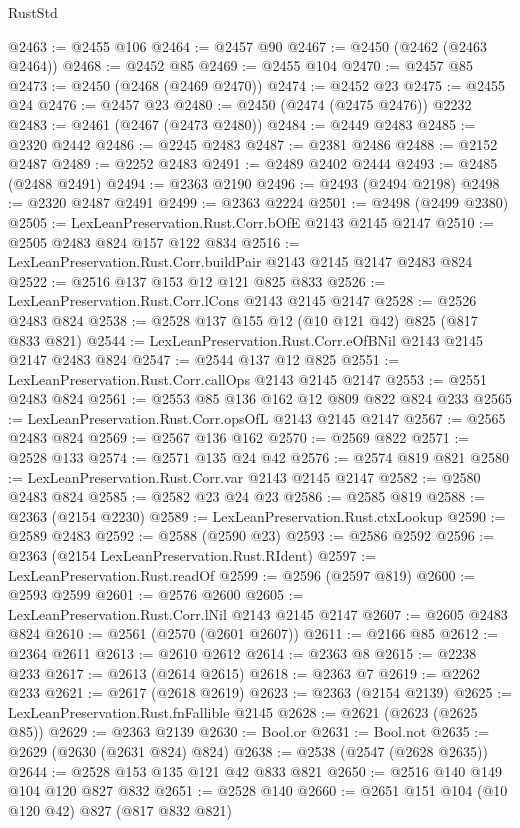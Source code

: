 \begin{lexlean}{RustStd}
\begin{coremodule}
@2463 := @2455 @106
@2464 := @2457 @90
@2467 := @2450 (@2462 (@2463 @2464))
@2468 := @2452 @85
@2469 := @2455 @104
@2470 := @2457 @85
@2473 := @2450 (@2468 (@2469 @2470))
@2474 := @2452 @23
@2475 := @2455 @24
@2476 := @2457 @23
@2480 := @2450 (@2474 (@2475 @2476)) @2232
@2483 := @2461 (@2467 (@2473 @2480))
@2484 := @2449 @2483
@2485 := @2320 @2442
@2486 := @2245 @2483
@2487 := @2381 @2486
@2488 := @2152 @2487
@2489 := @2252 @2483
@2491 := @2489 @2402 @2444
@2493 := @2485 (@2488 @2491)
@2494 := @2363 @2190
@2496 := @2493 (@2494 @2198)
@2498 := @2320 @2487 @2491
@2499 := @2363 @2224
@2501 := @2498 (@2499 @2380)
@2505 := LexLeanPreservation.Rust.Corr.bOfE @2143 @2145 @2147
@2510 := @2505 @2483 @824 @157 @122 @834
@2516 := LexLeanPreservation.Rust.Corr.buildPair @2143 @2145 @2147 @2483 @824
@2522 := @2516 @137 @153 @12 @121 @825 @833
@2526 := LexLeanPreservation.Rust.Corr.lCons @2143 @2145 @2147
@2528 := @2526 @2483 @824
@2538 := @2528 @137 @155 @12 (@10 @121 @42) @825 (@817 @833 @821)
@2544 := LexLeanPreservation.Rust.Corr.eOfBNil @2143 @2145 @2147 @2483 @824
@2547 := @2544 @137 @12 @825
@2551 := LexLeanPreservation.Rust.Corr.callOps @2143 @2145 @2147
@2553 := @2551 @2483 @824
@2561 := @2553 @85 @136 @162 @12 @809 @822 @824 @233
@2565 := LexLeanPreservation.Rust.Corr.opsOfL @2143 @2145 @2147
@2567 := @2565 @2483 @824
@2569 := @2567 @136 @162
@2570 := @2569 @822
@2571 := @2528 @133
@2574 := @2571 @135 @24 @42
@2576 := @2574 @819 @821
@2580 := LexLeanPreservation.Rust.Corr.var @2143 @2145 @2147
@2582 := @2580 @2483 @824
@2585 := @2582 @23 @24 @23
@2586 := @2585 @819
@2588 := @2363 (@2154 @2230)
@2589 := LexLeanPreservation.Rust.ctxLookup
@2590 := @2589 @2483
@2592 := @2588 (@2590 @23)
@2593 := @2586 @2592
@2596 := @2363 (@2154 LexLeanPreservation.Rust.RIdent)
@2597 := LexLeanPreservation.Rust.readOf
@2599 := @2596 (@2597 @819)
@2600 := @2593 @2599
@2601 := @2576 @2600
@2605 := LexLeanPreservation.Rust.Corr.lNil @2143 @2145 @2147
@2607 := @2605 @2483 @824
@2610 := @2561 (@2570 (@2601 @2607))
@2611 := @2166 @85
@2612 := @2364 @2611
@2613 := @2610 @2612
@2614 := @2363 @8
@2615 := @2238 @233
@2617 := @2613 (@2614 @2615)
@2618 := @2363 @7
@2619 := @2262 @233
@2621 := @2617 (@2618 @2619)
@2623 := @2363 (@2154 @2139)
@2625 := LexLeanPreservation.Rust.fnFallible @2145
@2628 := @2621 (@2623 (@2625 @85))
@2629 := @2363 @2139
@2630 := Bool.or
@2631 := Bool.not
@2635 := @2629 (@2630 (@2631 @824) @824)
@2638 := @2538 (@2547 (@2628 @2635))
@2644 := @2528 @153 @135 @121 @42 @833 @821
@2650 := @2516 @140 @149 @104 @120 @827 @832
@2651 := @2528 @140
@2660 := @2651 @151 @104 (@10 @120 @42) @827 (@817 @832 @821)

\end{coremodule}
\end{lexlean}
